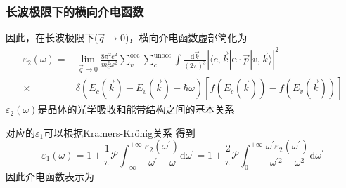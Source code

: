 {\frame
{
	\frametitle{长波极限下的横向介电函数}
因此，在长波极限下($\vec q\rightarrow0$)，横向介电函数虚部简化为
\begin{displaymath}
	\begin{aligned}
		\varepsilon_2(\omega)=&\lim_{\vec q\rightarrow0}\frac{8\pi^2e^2}{m_e^2\omega^2}\sum_{v}^{\mathrm{occ}}\sum_{c}^{\mathrm{unocc}}\int\frac{\mathrm{d}\vec k}{(2\pi)^3}|\langle c,\vec k|\mathbf{e}\cdot\vec p|v,\vec k\rangle|^2\\
		\times&\delta(E_c(\vec k)-E_v(\vec k)-\hbar\omega)[f(E_c(\vec k))-f(E_v(\vec k))]
	\end{aligned}
  \label{eq:optic-varepsilon_2}
\end{displaymath}
$\varepsilon_2(\omega)$是晶体的光学吸收和能带结构之间的基本关系

对应的$\varepsilon_1$可以根据\textrm{Kramers-Kr\"onig}关系%
得到
\begin{displaymath}
	\varepsilon_1(\omega)=1+\frac1{\pi}\mathscr{P}\int_{-\infty}^{+\infty}\frac{\varepsilon_2(\omega^{\prime})}{\omega^{\prime}-\omega}\textrm{d}\omega^{\prime}=1+\frac2{\pi}\mathscr{P}\int_0^{+\infty}\frac{\omega^{\prime}\varepsilon_2(\omega^{\prime})}{\omega^{\prime2}-\omega^2}\textrm{d}\omega^{\prime}
  \label{eq:optic-varepsilon_1}
\end{displaymath}
因此介电函数表示为
{\fontsize{9.5pt}{6.2pt}}
}

}
